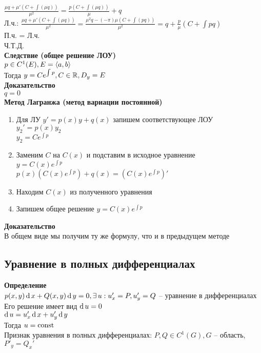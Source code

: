 \documentclass[12pt]{article}
\begin{document}
$\frac{\mu q + \mu'(C+\int (\mu q))}{\mu^2} = \frac{p(C+\int (\mu q))}\mu + q$\\
Л.ч.: $\frac{\mu q + \mu'(C+\int (\mu q))}{\mu^2} = \frac{\mu^2 q - (-\pi)\mu(C+\int (pq))}{\mu^2} = q + \frac p\mu(C+\int pq)$\\
П.ч. = Л.ч.\\
Ч.Т.Д.\\
\textbf{Следствие (общее решение ЛОУ)}\\
$p \in C^1(E), E = \langle a, b \rangle$\\
Тогда $y = Ce^{\int p}, C \in \mathbb{R}, D_y = E$\\
\textbf{Доказательство}\\
$q = 0$\\
\textbf{Метод Лагранжа (метод вариации постоянной)}
\begin{enumerate}
    \item Для ЛУ $y' = p(x)y + q(x)$ запишем соответствующее ЛОУ\\
    $y_2'=p(x)y_2$\\
    $y_2=Ce^{\int p}$
    \item Заменим $C$ на $C(x)$ и подставим в исходное уравнение\\
    $y = C(x)e^{\int p}$\\
    $p(x)(C(x)e^{\int p})+q(x) = (C(x)e^{\int p})'$
    \item Находим $C(x)$ из полученного уравнения
    \item Запишем общее решение $y=C(x)e^{\int p}$
\end{enumerate}
\textbf{Доказательство}\\
В общем виде мы получим ту же формулу, что и в предыдущем методе
\subsection{Уравнение в полных дифференциалах}
\textbf{Определение}\\
$p(x,y)\operatorname{d} x + Q(x,y)\operatorname{d} y = 0, \exists\, u: u_x'=P, u_y' = Q$ -- уравнение в дифференциалах\\
Его решение имеет вид $\operatorname{d} u = 0$\\
$\operatorname{d} u = u_x'\operatorname{d} x + u_y'\operatorname{d} y$\\
Тогда $u = \operatorname{const}$\\
Признак уравнения в полных дифференциалах: $P,Q \in C^1(G), G$ -- область, $P'_y = Q_x'$
\end{document}
